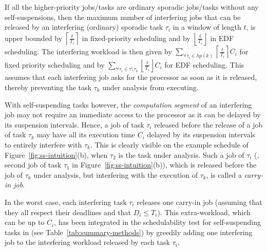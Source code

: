 \label{sec:model-carry-in}

If all the higher-priority jobs/tasks are ordinary sporadic jobs/tasks without any self-suspensions, then
the maximum number of interfering jobs that can be released by an interfering (ordinary) sporadic task $\tau_i$ in a window of length $t$, is upper bounded by $\left\lceil \frac{t}{T_i} \right\rceil$ in fixed-priority scheduling and by $\left\lfloor \frac{t}{T_i} \right\rfloor$ in EDF scheduling. The interfering workload is then given by $\sum_{\forall \tau_i \in hp(k)} \left\lceil \frac{t}{T_i} \right\rceil C_i$ for fixed priority scheduling and by $\sum_{\forall \tau_i \in \tau \setminus \tau_k} \left\lfloor \frac{t}{T_i} \right\rfloor C_i$ for EDF scheduling. This assumes that each interfering job asks for the processor as soon as it is released, thereby preventing the task $\tau_k$ under analysis from executing.

With self-suspending tasks however, the \emph{computation segment} of an interfering job may not require an immediate access to the processor as it can be delayed by its suspension intervals. Hence, a job of task $\tau_i$ released before the release of a job of task $\tau_k$ may have all its execution time $C_i$ delayed by its suspension intervals to entirely interfere with $\tau_k$. 
This is clearly visible on the example schedule of Figure~\ref{fig:ss-intuition}(b), when $\tau_2$ is the task under analysis.
Such a job of $\tau_i$ (\eg, second job of task $\tau_1$ in Figure~\ref{fig:ss-intuition}(b)), which is released before the job of $\tau_k$ under analysis, but interfering with the execution of $\tau_k$, is called a \emph{carry-in job}.

In the worst case, each interfering task $\tau_i$ releases one carry-in job (assuming that they all respect their deadlines and that $D_i \leq T_i$). This extra-workload, which can be up to $C_i$, has been integrated in the schedulability test for self-suspending tasks in \cite{huangpass:dac2015,LiuChen:rtss2014} (see Table~\ref{tab:summary-methods}) by greedily adding one interfering job to the interfering workload released by each task $\tau_i$.




